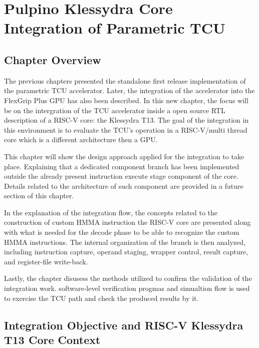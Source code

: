 \chapter{Pulpino Klessydra Core Integration of Parametric TCU}

\section{Chapter Overview}


The previous chapters presented the standalone first release implementation of the parametric TCU accelerator. Later, the integration of the accelerator into the FlexGrip Plus GPU has also been described. In this new chapter, the focus will be on the intergration of the TCU accelerator inside a open source RTL description of a RISC-V core: the Klessydra T13. The goal of the integration in this environment is to evaluate the TCU's operation in a RISC-V/multi thread core which is a different architecture then a GPU.

This chapter will show the design approach applied for the integration to take place. Explaining that a dedicated component branch has been implemented outside the already present instruction execute stage component of the core. Details related to the architecture of such component are provided in a future section of this chapter.

In the explanation of the integration flow, the concepts related to the construction of custom HMMA instruction the RISC-V core are presented along with what is needed for the decode phase to be able to recognize the custom HMMA instructions. The internal organization of the branch is then analyzed, including instruction capture, operand staging, wrapper control, result capture,
and register-file write-back. 

Lastly, the chapter disusess the methods utilized to confirm the validation of the integration work. software-level verification progmas and simualtion flow is used to exercise the TCU path and check the produced results by it.

\section{Integration Objective and RISC-V Klessydra T13 Core Context}

